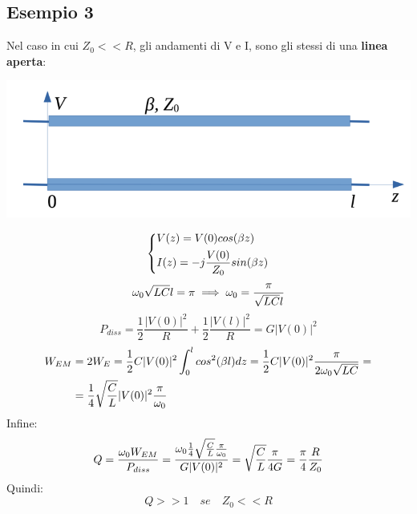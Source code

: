 \subsection{Esempio 3}
Nel caso in cui $Z_0 << R$, gli andamenti di V e I, sono gli stessi di una \textbf{linea aperta}:
\begin{center}
    \includegraphics[width=.8\textwidth]{Images/figure30.png}
\end{center}
\begin{equation*}
    \begin{dcases}
    V(z) = V(0) cos(\beta z)\\
    I(z) = -j \frac{V(0)}{Z_0} sin(\beta z)
    \end{dcases}
\end{equation*}
\begin{equation*}
    \omega_0 \sqrt{LC} l = \pi \implies \omega_0 = \frac{\pi}{\sqrt{LC} l}
\end{equation*}
\begin{equation*}
    P_{diss} = \frac{1}{2} \frac{|V(0)|^2}{R} + \frac{1}{2} \frac{|V(l)|^2}{R} = G|V(0)|^2
\end{equation*}
\begin{equation*}
\begin{aligned}
    W_{EM} &= 2W_E = \frac{1}{2} C |V(0)|^2 \int_0^l cos^2(\beta l) dz = \frac{1}{2} C |V(0)|^2 \frac{\pi}{2\omega_0 \sqrt{LC}} = \\
    &=\frac{1}{4} \sqrt{\frac{C}{L}} |V(0)|^2 \frac{\pi}{\omega_0}
\end{aligned}
\end{equation*}
Infine:
\begin{equation*}
    Q = \frac{\omega_0 W_{EM}}{P_{diss}} = \frac{\omega_0 \frac{1}{4} \sqrt{\frac{C}{L}} \frac{\pi}{\omega_0}} {G|V(0)|^2} =\sqrt{\frac{C}{L}} \frac{\pi}{4G} = \frac{\pi}{4} \frac{R}{Z_0}
\end{equation*}
Quindi:
\begin{equation*}
    Q >> 1 \quad se \quad Z_0 << R
\end{equation*}

